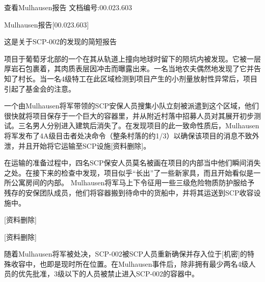 \begin{scpbox}
查看Mulhausen报告 文档编号:00.023.603
\end{scpbox}

\begin{scpbox}

Mulhausen报告[00.023.603]

这是关于SCP-002的发现的简短报告

项目于葡萄牙北部的一个在其从轨道上撞向地球时留下的陨坑内被发现。它被一层厚岩石包裹着，其肉质表层因冲击而曝露出来。一名当地农夫偶然地发现了它并告知了村长。当一名4级特工在此区域检测到项目产生的小剂量放射性异常后，项目引起了基金会的注意。

一个由Mulhausen将军带领的SCP安保人员搜集小队立刻被派遣到这个区域，他们很快就将项目保存于一个巨大的容器里，并从附近村落中招募人员对其展开初步测试。三名男人分别进入建筑后消失了。在发现项目的此一致命性质后，Mulhausen将军发布了4A级目击者处决命令（整条村落的约1/3）以确保该项目的消息不致外泄，并且开始将它运输至SCP设施[资料删除]。

在运输的准备过程中，四名SCP保安人员莫名被画在项目的内部当中他们瞬间消失之处。在接下来的检查中发现，项目似乎“长出”了一些新家具，而且开始看似是一所公寓房间的内部。 Mulhausen将军马上下令征用一些三级危险物质防护服给予残存的安保团队成员，他们将容器搬到待命中的货船中，并将其运送到SCP收容设施中。

[资料删除]

[资料删除]

随着Mulhausen将军被处决，SCP-002被SCP人员重新确保并存入位于[机密]的特殊收容中，也即是现时所在位置。在Mulhausen事件后，除非拥有最少两名4级人员的优先批准，3级以下的人员被禁止进入SCP-002的容器中。

\end{scpbox}